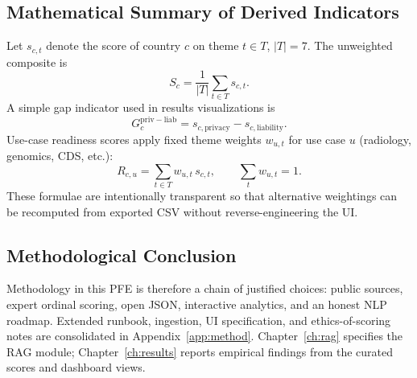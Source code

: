 \subsection{Mathematical Summary of Derived Indicators}
\label{sec:mathsummary}

Let $s_{c,t}$ denote the score of country $c$ on theme $t\in T$, $|T|=7$. The unweighted composite is
\begin{equation}
S_c=\frac{1}{|T|}\sum_{t\in T}s_{c,t}.
\end{equation}
A simple gap indicator used in results visualizations is
\begin{equation}
G_c^{\mathrm{priv-liab}}=s_{c,\mathrm{privacy}}-s_{c,\mathrm{liability}}.
\end{equation}
Use-case readiness scores apply fixed theme weights $w_{u,t}$ for use case $u$ (radiology, genomics, CDS, etc.):
\begin{equation}
R_{c,u}=\sum_{t\in T}w_{u,t}\,s_{c,t},\qquad \sum_{t}w_{u,t}=1.
\end{equation}
These formulae are intentionally transparent so that alternative weightings can be recomputed from exported CSV without reverse-engineering the UI.

\subsection{Methodological Conclusion}
\label{sec:methodconcl}

Methodology in this PFE is therefore a chain of justified choices: public sources, expert ordinal scoring, open JSON, interactive analytics, and an honest NLP roadmap. Extended runbook, ingestion, UI specification, and ethics-of-scoring notes are consolidated in Appendix~\ref{app:method}. Chapter~\ref{ch:rag} specifies the RAG module; Chapter~\ref{ch:results} reports empirical findings from the curated scores and dashboard views.


